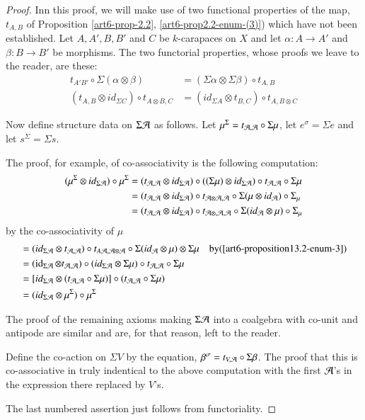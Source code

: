 \begin{proof}
Inn this proof, we will make use of two functional properties of the map, $t_{A, B}$ of Proposition
\ref{art6-prop-2.2}, \ref{art6-prop2.2-enum-(3)}) which have not been established. Let $A, A', B, B'$ and $C$ be $k$-carapaces on $X$ and let $\alpha : A \rightarrow A'$ and $ \beta : B \rightarrow B'$ be morphisms. The two functorial properties, whose proofs we leave to the reader, are these:
\begin{align}\label{art6-eq-13.3}
t_{A' B'} \circ \Sigma(\alpha \otimes \beta) &= (\Sigma \alpha \otimes \Sigma \beta) \circ t_{A, B}\nonumber\\
(t_{A, B}\otimes id_{\Sigma C}) \circ t_{A \otimes B,C} &= (id_{\Sigma A} \otimes t_{B, C}) \circ t_{A, B \otimes C}
\end{align}

Now define structure data on $\Sigma \mathcal{A}$ as follows. Let $\mu^{\Sigma} = t_{\mathcal{A}, \mathcal{A}} \circ \Sigma\mu$, let $e^{\sigma} = \Sigma e$ and let $s^{\Sigma} = \Sigma s$.

The proof, for example, of co-associativity is the following computation:
\begin{align*}
(\mu^{\Sigma} \otimes id_{\Sigma \mathcal{A}}) \circ \mu^{\Sigma} &= (t_{\mathcal{A}, \mathcal{A}} \otimes id_{\Sigma \mathcal{A}}) \circ ((\Sigma\mu) \otimes id_{\Sigma \mathcal{A}}) \circ t_{\mathcal{A}, \mathcal{A}} \circ \Sigma\mu \\
&= (t_{\mathcal{A}, \mathcal{A}} \otimes id_{\Sigma \mathcal{A}}) \circ  t_{\mathcal{A} \otimes \mathcal{A}, \mathcal{A}} \circ \Sigma(\mu \otimes id_{\mathcal{A}}) \circ \Sigma_{\mu}\\
&= (t_{\mathcal{A}, \mathcal{A}} \otimes id_{\Sigma\mathcal{A}}) \circ t_{\mathcal{A} \otimes, \mathcal{A}, \mathcal{A}} \circ \Sigma(id_{\mathcal{A}} \otimes \mu) \circ \Sigma_{\mu}
\end{align*}
by the co-associativity of $\mu$
\begin{align*}
& = (id_{\Sigma\mathcal{A}} \otimes t_{\mathcal{A}, \mathcal{A}}) \circ t_{A\mathcal{A}, \mathcal{A} \otimes \mathcal{A}} \circ \Sigma(id_{\mathcal{A}} \otimes \mu) \otimes \Sigma\mu \quad \text{by} (\ref{art6-proposition13.2-enum-3})\\
&= (\operatorname{id}_{\Sigma \mathcal{A}} \otimes t_{\mathcal{A}, \mathcal{A}}) \circ (id_{\Sigma \mathcal{A}} \otimes \Sigma\mu) \circ t_{\mathcal{A}, \mathcal{A}} \circ \Sigma\mu\\
&=[id_{\Sigma \mathcal{A}} \otimes (t_{\mathcal{A}, \mathcal{A}} \circ \Sigma\mu)]\circ (t_{\mathcal{A}, \mathcal{A}} \circ \Sigma\mu)\\
&= (id_{\Sigma \mathcal{A}} \otimes \mu^{\Sigma}) \circ \mu^{\Sigma}
\end{align*}

The proof of the remaining axioms making $\Sigma \mathcal{A}$ into a coalgebra with co-unit and antipode are similar and are, for that reason, left to the reader.

Define the co-action on $\Sigma V$ by the equation, $\beta^{\sigma} = t_{V, \mathcal{A}} \circ \Sigma \beta$. The proof that this is co-associative in truly indentical to the above computation with the first $\mathcal{A}$'s in the expression there replaced by $V$'s.

The last numbered assertion just follows from functoriality.
\end{proof}

